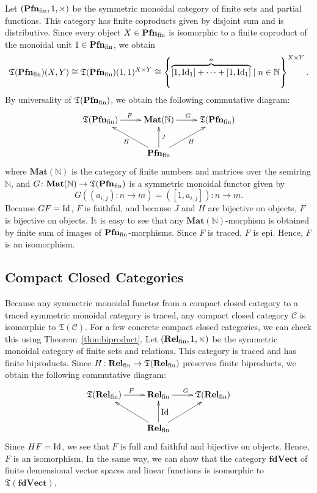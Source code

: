 Let $(\mathbf{Pfn}_{\mathrm{fin}},1,\times)$ be the symmetric monoidal category of finite
sets and partial functions. This category has finite coproducts given
by disjoint sum and is distributive. Since every object
$X \in \mathbf{Pfn}_{\mathrm{fin}}$ is isomorphic to a finite coproduct of the monoidal
unit $1 \in \mathbf{Pfn}_{\mathrm{fin}}$, we obtain
\begin{equation*}
  \mathfrak{T}(\mathbf{Pfn}_{\mathrm{fin}})(X,Y) \cong
  \mathfrak{T}(\mathbf{Pfn}_{\mathrm{fin}})(1,1)^{X \times Y}
  \cong \left\{\overbrace{[1,\mbox{\normalfont Id}_{1}] + \cdots + [1,\mbox{\normalfont Id}_{1}]}^{n}
    \mid n \in \mathbb{N}\right\}^{X \times Y}.
\end{equation*}
By universality of $\mathfrak{T}(\mathbf{Pfn}_{\mathrm{fin}})$, we obtain
the following commutative diagram:
\begin{equation*}
  \xymatrix{
    \mathfrak{T}(\fPfn) \ar[r]^{F} &
    \mathbf{Mat}(\mathbb{N}) \ar[r]^{G} &
    \mathfrak{T}(\fPfn) \\
    & \fPfn \ar[ru]_{H} \ar[u]_{J} \ar[lu]^{H} &
  }
\end{equation*}
where $\mathbf{Mat}(\mathbb{N})$ is the category of finite numbers
and matrices over the semiring $\mathbb{N}$, and
$G \colon \mathbf{Mat}(\mathbb{N}) \to \mathfrak{T}(\mathbf{Pfn}_{\mathrm{fin}})$
is a symmetric monoidal functor given by
\begin{equation*}
  G((a_{i,j}) \colon n \to m)
  = ([1,a_{i,j}]) \colon n \to m.
\end{equation*}
Because $GF = \mbox{\normalfont Id}$, $F$ is faithful, and
because $J$ and $H$ are bijective on objects,
$F$ is bijective on objects.
It is easy to see that any $\mathbf{Mat}(\mathbb{N})$-morphism
is obtained by finite sum of images of $\mathbf{Pfn}_{\mathrm{fin}}$-morphisms.
Since $F$ is traced, $F$ is epi. Hence, $F$ is an isomorphism.


\subsection{Compact Closed Categories}

Because any symmetric monoidal functor from a compact closed category
to a traced symmetric monoidal category is traced, any compact closed
category $\mathcal{C}$ is isomorphic to
$\mathfrak{T}(\mathcal{C})$. For a few concrete compact closed
categories, we can check this using Theorem~\ref{thm:biproduct}. Let
$(\mathbf{Rel}_{\mathrm{fin}},1,\times)$ be the symmetric monoidal category of finite sets
and relations. This category is traced and has finite biproducts.
Since $H \colon \mathbf{Rel}_{\mathrm{fin}} \to \mathfrak{T}(\mathbf{Rel}_{\mathrm{fin}})$ preserves finite
biproducts, we obtain the following commutative diagram:
\begin{equation*}
  \xymatrix{
    \mathfrak{T}(\fRel) \ar[r]^{F} &
    \fRel \ar[r]^{G} &
    \mathfrak{T}(\fRel) \\
    & \fRel \ar[ru] \ar[u]_{\Id} \ar[lu] &
  }
\end{equation*}
Since $HF = \mbox{\normalfont Id}$, we see that $F$ is full and faithful and
bijective on objects. Hence, $F$ is an isomorphism. In the same way,
we can show that the category $\mathbf{fdVect}$ of finite
demensional vector spaces and linear functions is isomorphic to
$\mathfrak{T}(\mathbf{fdVect})$.

